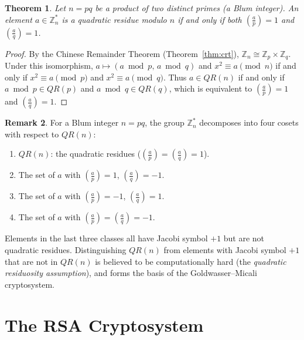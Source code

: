 \documentclass[twoside,12pt]{book}
\theoremstyle{plain}
\newtheorem{theorem}{Theorem}[chapter]
\theoremstyle{definition}
\newtheorem{remark}[theorem]{Remark}
\theoremstyle{remark}
\begin{document}
\begin{theorem}
\label{thm:qr-composite}
Let $n = pq$ be a product of two distinct primes (a \emph{Blum integer}). An element $a \in \mathbb{Z}_n^*$ is a quadratic residue modulo $n$ if and only if both $\left(\frac{a}{p}\right) = 1$ and $\left(\frac{a}{q}\right) = 1$.
\end{theorem}

\begin{proof}
By the Chinese Remainder Theorem (Theorem~\ref{thm:crt}), $\mathbb{Z}_n \cong \mathbb{Z}_p \times \mathbb{Z}_q$. Under this isomorphism, $a \mapsto (a \bmod p, \, a \bmod q)$ and $x^2 \equiv a \pmod{n}$ if and only if $x^2 \equiv a \pmod{p}$ and $x^2 \equiv a \pmod{q}$. Thus $a \in QR(n)$ if and only if $a \bmod p \in QR(p)$ and $a \bmod q \in QR(q)$, which is equivalent to $\left(\frac{a}{p}\right) = 1$ and $\left(\frac{a}{q}\right) = 1$.
\end{proof}

\begin{remark}
For a Blum integer $n = pq$, the group $\mathbb{Z}_n^*$ decomposes into four cosets with respect to $QR(n)$:
\begin{enumerate}[nosep]
    \item $QR(n)$: the quadratic residues ($\left(\frac{a}{p}\right) = \left(\frac{a}{q}\right) = 1$).
    \item The set of $a$ with $\left(\frac{a}{p}\right) = 1$, $\left(\frac{a}{q}\right) = -1$.
    \item The set of $a$ with $\left(\frac{a}{p}\right) = -1$, $\left(\frac{a}{q}\right) = 1$.
    \item The set of $a$ with $\left(\frac{a}{p}\right) = \left(\frac{a}{q}\right) = -1$.
\end{enumerate}
Elements in the last three classes all have Jacobi symbol $+1$ but are not quadratic residues. Distinguishing $QR(n)$ from elements with Jacobi symbol $+1$ that are not in $QR(n)$ is believed to be computationally hard (the \emph{quadratic residuosity assumption}), and forms the basis of the Goldwasser--Micali cryptosystem.
\end{remark}

\section{The RSA Cryptosystem}
\label{sec:rsa}
\end{document}
